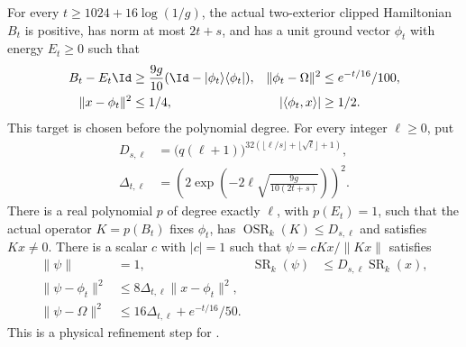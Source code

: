 \begin{lemma}
    For every $t\ge1024+16\log(1/g)$, the actual two-exterior clipped
    Hamiltonian $B_t$ is positive, has norm at most $2t+s$, and has a
    unit ground vector $\phi_t$ with energy $E_t\ge0$ such that
    \begin{align*}
        B_t-E_t\Id                          & \ge\frac{9g}{10}
        (\Id-|\phi_t\rangle\langle\phi_t|), &
        \|\phi_t-\Omega\|^2                 & \le e^{-t/16}/100,   \\
        \|x-\phi_t\|^2                      & \le1/4,            &
        |\langle\phi_t,x\rangle|            & \ge1/2.
    \end{align*}
    This target is chosen before the polynomial degree.
    For every integer $\ell\ge0$, put
    \begin{align*}
        D_{s,\ell}      & =\bigl(q(\ell+1)\bigr)^ {
        32(\lfloor\ell/s\rfloor+\lfloor\sqrt\ell\rfloor+1)}, \\
        \Delta_{t,\ell} & =
        \left(2\exp\left(-2\ell\sqrt{\frac{9g}{10(2t+s)}}\right)\right)^2.
    \end{align*}
    There is a real polynomial $p$ of degree exactly $\ell$, with
    $p(E_t)=1$, such that the actual operator $K=p(B_t)$ fixes $\phi_t$,
    has $\operatorname{OSR}_k(K)\le D_{s,\ell}$ and satisfies $Kx\ne0$.
    There is a scalar $c$ with $|c|=1$ such that
    $\psi=cKx/\|Kx\|$ satisfies
    \begin{align*}
        \|\psi\|                  & =1,                                   &
        \operatorname{SR}_k(\psi) & \le D_{s,\ell}\operatorname{SR}_k(x),   \\
        \|\psi-\phi_t\|^2
                                  & \le8\Delta_{t,\ell}\|x-\phi_t\|^2,      \\
        \|\psi-\Omega\|^2
                                  & \le16\Delta_{t,\ell}+e^{-t/16}/50.
    \end{align*}
    This is a physical refinement step for
    \cite[Lemma~6.3 and Section~7]{Arad2013AreaLaw}.
\end{lemma}

